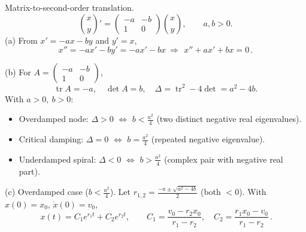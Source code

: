 \documentclass[11pt]{article}
\def\textbf#1{#1}%
\begin{document}
\begin{solution}
\textbf{Matrix-to-second-order translation.}
\[
\binom{x}{y}'=
\begin{pmatrix}-a&-b\\1&0\end{pmatrix}\binom{x}{y},\qquad a,b>0.
\]
(a) From \(x'=-a x-b y\) and \(y'=x\),
\[
x''=-a x'-b y'=-a x'-b x\ \Longrightarrow\ \boxed{\,x''+a x'+b x=0\,}.
\]

(b) For \(A=\begin{pmatrix}-a&-b\\1&0\end{pmatrix}\),
\[
\operatorname{tr}A=-a,\quad \det A=b,\quad \Delta=\operatorname{tr}^2-4\det=a^2-4b.
\]
With \(a>0,\ b>0\):
\begin{itemize}
\item Overdamped node: \(\Delta>0\) \(\Leftrightarrow\) \(b<\tfrac{a^2}{4}\) (two distinct negative real eigenvalues).
\item Critical damping: \(\Delta=0\) \(\Leftrightarrow\) \(b=\tfrac{a^2}{4}\) (repeated negative eigenvalue).
\item Underdamped spiral: \(\Delta<0\) \(\Leftrightarrow\) \(b>\tfrac{a^2}{4}\) (complex pair with negative real part).
\end{itemize}

(c) Overdamped case (\(b<\tfrac{a^2}{4}\)). Let \(r_{1,2}=\frac{-a\pm\sqrt{a^2-4b}}{2}\) (both \(<0\)).
With \(x(0)=x_0\), \(\dot x(0)=v_0\),
\[
\boxed{\,x(t)=C_1 e^{r_1 t}+C_2 e^{r_2 t},\qquad
C_1=\frac{v_0-r_2 x_0}{r_1-r_2},\quad
C_2=\frac{r_1 x_0-v_0}{r_1-r_2}\, }.
\]
\end{solution}
\end{document}
